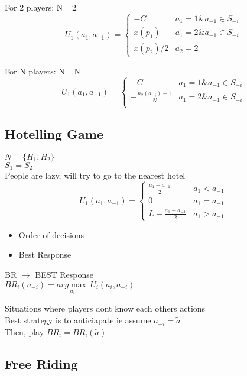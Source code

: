 \documentclass{article}
\begin{document}
For 2 players: N= 2 \\
\[ 
U_1(a_1, a_{-1})= \left\{
  \begin{array}{lr} 
    -C &  a_1 = 1 \& a_{-1} \in S_{-i}\\
    x(p_1) &  a_1 = 2 \& a_{-1} \in S_{-i}\\
    x(p_2)/2 &  a_2 = 2
    \end{array}
\right.
\]

For N players: N= N \\
\[ 
U_1(a_1, a_{-1})= \left\{
  \begin{array}{lr} 
    -C & a_1 = 1 \& a_{-1} \in S_{-i}\\
    - \frac{n_2(a_{-i})+1}{N} & a_1 = 2 \& a_{-1} \in S_{-i} \\
    \end{array}
\right.
\]

\subsection{Hotelling Game}
$N = \{H_1, H_2\}$ \\
$S_1 = S_2$ \\

People are lazy, will try to go to the nearest hotel
\[ 
U_1(a_1, a_{-1})= \left\{
  \begin{array}{lr} 
    \frac{a_1 + a_{-1}}{2} & a_1 <a_{-1} \\
    0 & a_1 = a_{-1} \\
    L - \frac{a_1 + a_{-1}}{2} & a_1 > a_{-1}

    \end{array}
\right.
\]

\begin{itemize}[itemsep=0pt,parsep=0pt,topsep=0pt]
  \item Order of decisions
  \item Best Response
\end{itemize}


BR $\rightarrow$ BEST Response \\
$BR_i(a_{-i}) = \underset{a_i}{arg \max} \ U_i(a_i, a_{-i})$


Situations where players dont know each others actions\\
Best strategy is to anticiapate ie assume $a_{-i} = \tilde{a}$\\
Then, play $BR_i = BR_i(\tilde{a})$ \\


\subsection{Free Riding}
\end{document}
